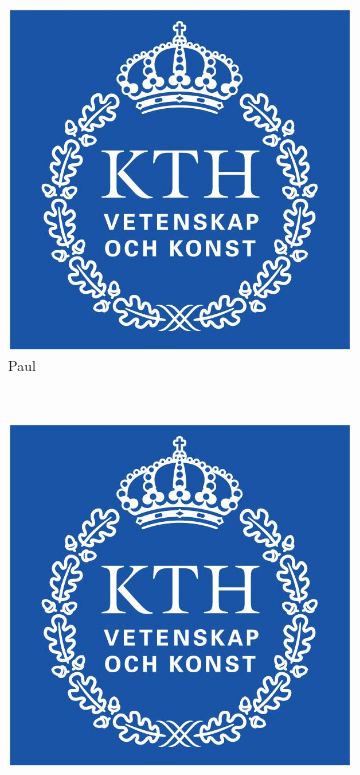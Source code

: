 \documentclass[a4paper,10pt]{article}
\begin{document}
\begin{titlepage}
\begin{center}
\begin{figure}[h]
\begin{subfigure}[b]{0.2\textwidth}
                \includegraphics[width=\textwidth]{kth_mathematics_rgb.jpg}
                \caption{Paul}
                \label{fig:Paul}
        \end{subfigure}
        \\ %
        \begin{subfigure}[b]{0.2\textwidth}
                \centering
                \includegraphics[width=\textwidth]{kth_mathematics_rgb.jpg}

\end{subfigure}
\end{figure}
\end{center}
\end{titlepage}
\end{document}

